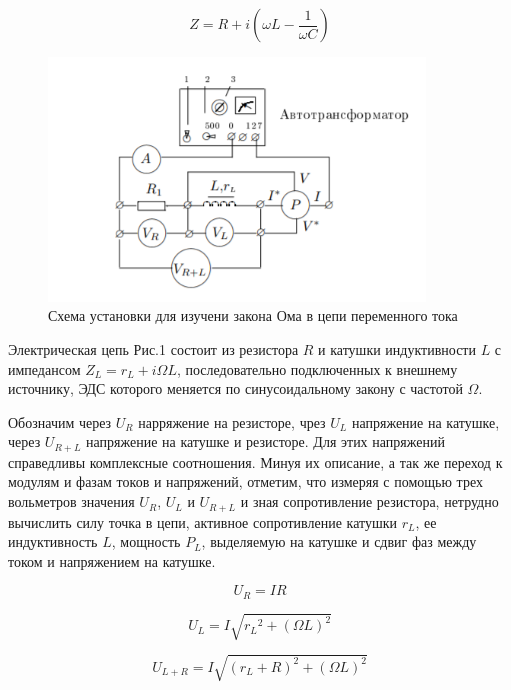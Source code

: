 \documentclass[a4paper,12pt]{article}
\begin{document}
\begin{equation}\label{}
Z = R + i(\omega L - \frac{1}{\omega C})
\end{equation}

\begin{figure}[h]
	\includegraphics[width= 10cm]{Pic1.png}
	\caption{Схема установки для изучени закона Ома в цепи переменного тока}
	\label{Pic1}
\end{figure}

Электрическая цепь Рис.1 состоит из резистора $R$ и катушки индуктивности $L$ с импедансом $Z_L = r_L + i{\Omega}L$, последовательно подключенных к внешнему источнику, ЭДС которого меняется по синусоидальному закону с частотой $\Omega$.

Обозначим через $U_R$ нарряжение на резисторе, чрез $U_L$ напряжение на катушке, через $U_{R+L}$ напряжение на катушке и резисторе. Для этих напряжений справедливы комплексные соотношения.
\newline
Минуя их описание, а так же переход к модулям и фазам токов и напряжений, отметим, что измеряя с помощью трех вольметров значения $U_R$, $U_L$ и $U_{R+L}$ и зная сопротивление резистора, нетрудно вычислить силу точка в цепи, активное сопротивление катушки $r_L$, ее индуктивность $L$, мощность $P_L$, выделяемую на катушке и сдвиг фаз между током и напряжением на катушке.

\begin{equation}\label{}
U_R = {I}{R}
\end{equation}

\begin{equation}\label{r_l sq}
U_L = {I}{\sqrt{{r_L}^2 + ({\Omega}{L})^2}} 
\end{equation}

\begin{equation}\label{}
U_{L+R} = {I}{\sqrt{ (r_L + R)^2 + ({\Omega}{L})^2}} 
\end{equation}
\end{document}
